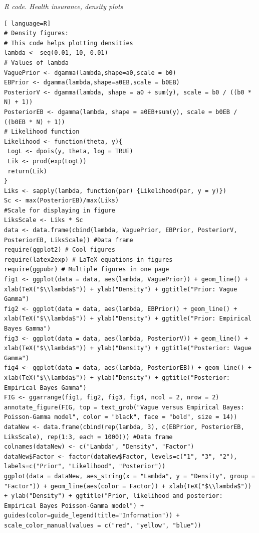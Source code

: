 \begin{tcolorbox}[enhanced,width=4.67in,center upper,
	fontupper=\large\bfseries,drop shadow southwest,sharp corners]
	\textit{R code. Health insurance, density plots}
\begin{VF}
\begin{lstlisting}[ language=R]		
# Density figures: 
# This code helps plotting densities
lambda <- seq(0.01, 10, 0.01) 
# Values of lambda
VaguePrior <- dgamma(lambda,shape=a0,scale = b0)
EBPrior <- dgamma(lambda,shape=a0EB,scale = b0EB)
PosteriorV <- dgamma(lambda, shape = a0 + sum(y), scale = b0 / ((b0 * N) + 1)) 
PosteriorEB <- dgamma(lambda, shape = a0EB+sum(y), scale = b0EB / ((b0EB * N) + 1))			
# Likelihood function
Likelihood <- function(theta, y){
 LogL <- dpois(y, theta, log = TRUE)
 Lik <- prod(exp(LogL))
 return(Lik)
}
Liks <- sapply(lambda, function(par) {Likelihood(par, y = y)})
Sc <- max(PosteriorEB)/max(Liks) 
#Scale for displaying in figure
LiksScale <- Liks * Sc
data <- data.frame(cbind(lambda, VaguePrior, EBPrior, PosteriorV, PosteriorEB, LiksScale)) #Data frame
require(ggplot2) # Cool figures
require(latex2exp) # LaTeX equations in figures
require(ggpubr) # Multiple figures in one page
fig1 <- ggplot(data = data, aes(lambda, VaguePrior)) + geom_line() + 	xlab(TeX("$\\lambda$")) + ylab("Density") +	ggtitle("Prior: Vague Gamma") 
fig2 <- ggplot(data = data, aes(lambda, EBPrior)) + geom_line() + xlab(TeX("$\\lambda$")) + ylab("Density") + ggtitle("Prior: Empirical Bayes Gamma")
fig3 <- ggplot(data = data, aes(lambda, PosteriorV)) + geom_line() + xlab(TeX("$\\lambda$")) + ylab("Density") + ggtitle("Posterior: Vague Gamma")
fig4 <- ggplot(data = data, aes(lambda, PosteriorEB)) + geom_line() + xlab(TeX("$\\lambda$")) + ylab("Density") + ggtitle("Posterior: Empirical Bayes Gamma")
FIG <- ggarrange(fig1, fig2, fig3, fig4, ncol = 2, nrow = 2)
annotate_figure(FIG, top = text_grob("Vague versus Empirical Bayes: Poisson-Gamma model", color = "black", face = "bold", size = 14))
dataNew <- data.frame(cbind(rep(lambda, 3), c(EBPrior, PosteriorEB, LiksScale), rep(1:3, each = 1000))) #Data frame
colnames(dataNew) <- c("Lambda", "Density", "Factor")
dataNew$Factor <- factor(dataNew$Factor, levels=c("1", "3", "2"), 
labels=c("Prior", "Likelihood", "Posterior"))
ggplot(data = dataNew, aes_string(x = "Lambda", y = "Density", group = "Factor")) + geom_line(aes(color = Factor)) + xlab(TeX("$\\lambda$")) + ylab("Density") + ggtitle("Prior, likelihood and posterior: Empirical Bayes Poisson-Gamma model") + guides(color=guide_legend(title="Information")) + scale_color_manual(values = c("red", "yellow", "blue"))
\end{lstlisting}
\end{VF}
\end{tcolorbox} 

